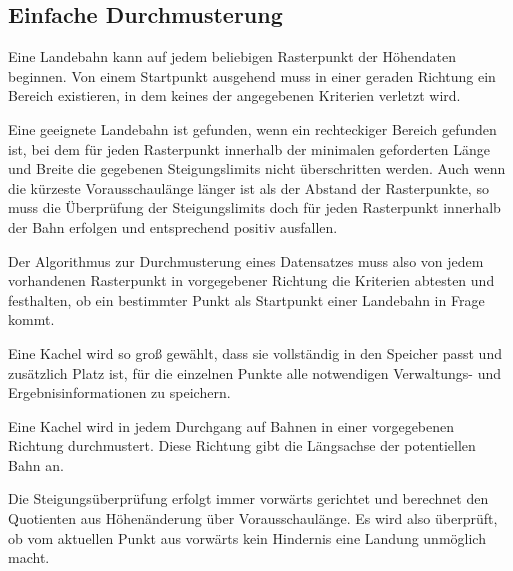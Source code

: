 \documentclass[
11pt, %
a4paper, %
oneside, %
pdfspacing, %
headinclude,
BCOR5mm, %
ngerman, %
bibtotocnumbered,
]{scrartcl}
\begin{document}
\subsection{Einfache Durchmusterung}\label{Einfache_Durchmusterung}
Eine Landebahn kann auf jedem beliebigen Rasterpunkt der Höhendaten beginnen. Von einem Startpunkt ausgehend muss in einer geraden Richtung ein Bereich existieren, in dem keines der angegebenen Kriterien verletzt wird. 

Eine geeignete Landebahn ist gefunden, wenn ein rechteckiger Bereich gefunden ist, bei dem für jeden Rasterpunkt innerhalb der minimalen geforderten Länge und Breite die gegebenen Steigungslimits nicht überschritten werden.
Auch wenn die kürzeste Vorausschaulänge länger ist als der Abstand der Rasterpunkte, so muss die Überprüfung der Steigungslimits doch für jeden Rasterpunkt innerhalb der Bahn erfolgen und entsprechend positiv ausfallen.

Der Algorithmus zur Durchmusterung eines Datensatzes muss also von jedem vorhandenen Rasterpunkt in vorgegebener Richtung die Kriterien abtesten und festhalten, ob ein bestimmter Punkt als Startpunkt einer Landebahn in Frage kommt.

Eine Kachel wird so groß gewählt, dass sie vollständig in den Speicher passt und zusätzlich Platz ist, für die einzelnen Punkte alle notwendigen Verwaltungs- und Ergebnisinformationen zu speichern.

Eine Kachel wird in jedem Durchgang auf Bahnen in einer vorgegebenen Richtung durchmustert. Diese Richtung gibt die Längsachse der potentiellen Bahn an.

Die Steigungsüberprüfung erfolgt immer vorwärts gerichtet und berechnet den Quotienten aus Höhenänderung über Vorausschaulänge. Es wird also überprüft, ob vom aktuellen Punkt aus vorwärts kein Hindernis eine Landung unmöglich macht.
\end{document}
